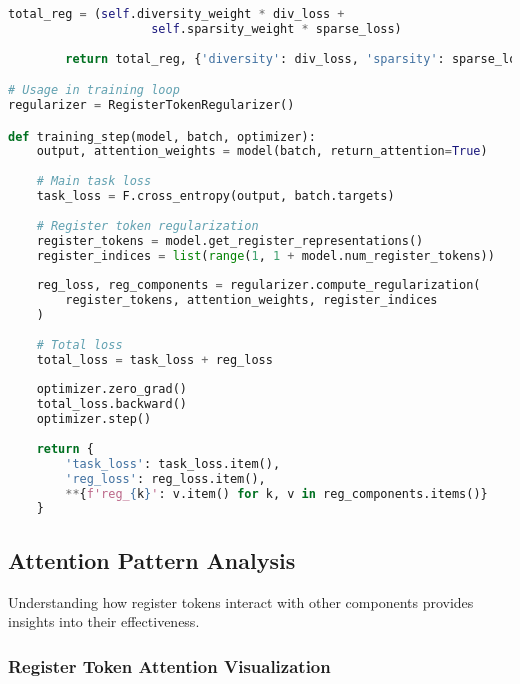 \begin{lstlisting}[language=Python, caption=Register token regularization strategies]
        total_reg = (self.diversity_weight * div_loss + 
                    self.sparsity_weight * sparse_loss)
        
        return total_reg, {'diversity': div_loss, 'sparsity': sparse_loss}

# Usage in training loop
regularizer = RegisterTokenRegularizer()

def training_step(model, batch, optimizer):
    output, attention_weights = model(batch, return_attention=True)
    
    # Main task loss
    task_loss = F.cross_entropy(output, batch.targets)
    
    # Register token regularization
    register_tokens = model.get_register_representations()
    register_indices = list(range(1, 1 + model.num_register_tokens))
    
    reg_loss, reg_components = regularizer.compute_regularization(
        register_tokens, attention_weights, register_indices
    )
    
    # Total loss
    total_loss = task_loss + reg_loss
    
    optimizer.zero_grad()
    total_loss.backward()
    optimizer.step()
    
    return {
        'task_loss': task_loss.item(),
        'reg_loss': reg_loss.item(),
        **{f'reg_{k}': v.item() for k, v in reg_components.items()}
    }
\end{lstlisting}

\subsection{Attention Pattern Analysis}

Understanding how register tokens interact with other components provides insights into their effectiveness.

\subsubsection{Register Token Attention Visualization}

